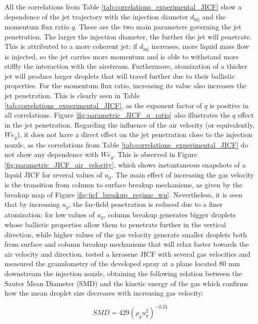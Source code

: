 All the correlations from Table \ref{tab:correlations_experimental_JICF} show a dependence of the jet trajectory with the injection diameter $d_\mathrm{inj}$ and the momentum flux ratio $q$. These are the two main parameters governing the jet penetration. The larger the injection diameter, the further the jet will penetrate. This is attributed to a more coherent jet: if $d_\mathrm{inj}$ increases, more liquid mass flow is injected, so the jet carries more momentum and is able to withstand more stiffly the
interaction with the airstream. Furthermore, atomization of a thicker jet will produce larger droplets that
will travel further due to their ballistic properties. For the momentum flux ratio, increasing its value also increases the jet penetration. This is clearly seen in Table \ref{tab:correlations_experimental_JICF}, as the exponent factor of $q$ is positive in all correlations. Figure \ref{fig:parametric_JICF_q_ratio} also illustrates the $q$ effect in the jet penetration. Regarding the influence of the air velocity (or equivalently, $We_g$), it does not have a direct effect on the jet penetration close to the injection nozzle, as the correlations from Table \ref{tab:correlations_experimental_JICF} do not show any dependence with $We_g$. This is observed in Figure \ref{fig:parametric_JICF_air_velocity}, which shows instantaneous snapshots of a liquid JICF for several values of $u_g$. The main effect of increasing the gas velocity is the transition from column to surface breakup mechanisms, as given by the breakup map of Figure \ref{fig:jicf_breakup_regime_wu}. Nevertheless, it is seen that by increasing $u_g$, the far-field penetration is reduced due to a finer atomization: for low values of $u_g$, column breakup generates bigger droplets whose ballistic properties allow them to penetrate further in the vertical direction, while higher values of the gas velocity generate smaller droplets both from surface and column breakup mechanisms that will relax faster towards the air velocity and direction.  tested a kerosene JICF with several gas velocities and measured the granulometry of the developed spray at a plane located 80 mm downstream the injection nozzle, obtaining the following relation between the Sauter Mean Diameter (SMD) and the kinetic energy of the gas which confirms how the mean droplet size decreases with increasing gas velocity:

\begin{equation}
SMD = 429 \left( \rho_g u_g^2 \right)^{-0.24}
\end{equation}



